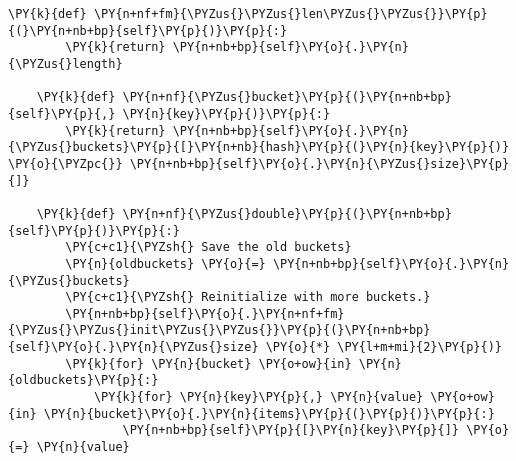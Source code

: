 \begin{Verbatim}[commandchars=\\\{\}]
    \PY{k}{def} \PY{n+nf+fm}{\PYZus{}\PYZus{}len\PYZus{}\PYZus{}}\PY{p}{(}\PY{n+nb+bp}{self}\PY{p}{)}\PY{p}{:}
        \PY{k}{return} \PY{n+nb+bp}{self}\PY{o}{.}\PY{n}{\PYZus{}length}

    \PY{k}{def} \PY{n+nf}{\PYZus{}bucket}\PY{p}{(}\PY{n+nb+bp}{self}\PY{p}{,} \PY{n}{key}\PY{p}{)}\PY{p}{:}
        \PY{k}{return} \PY{n+nb+bp}{self}\PY{o}{.}\PY{n}{\PYZus{}buckets}\PY{p}{[}\PY{n+nb}{hash}\PY{p}{(}\PY{n}{key}\PY{p}{)} \PY{o}{\PYZpc{}} \PY{n+nb+bp}{self}\PY{o}{.}\PY{n}{\PYZus{}size}\PY{p}{]}

    \PY{k}{def} \PY{n+nf}{\PYZus{}double}\PY{p}{(}\PY{n+nb+bp}{self}\PY{p}{)}\PY{p}{:}
        \PY{c+c1}{\PYZsh{} Save the old buckets}
        \PY{n}{oldbuckets} \PY{o}{=} \PY{n+nb+bp}{self}\PY{o}{.}\PY{n}{\PYZus{}buckets}
        \PY{c+c1}{\PYZsh{} Reinitialize with more buckets.}
        \PY{n+nb+bp}{self}\PY{o}{.}\PY{n+nf+fm}{\PYZus{}\PYZus{}init\PYZus{}\PYZus{}}\PY{p}{(}\PY{n+nb+bp}{self}\PY{o}{.}\PY{n}{\PYZus{}size} \PY{o}{*} \PY{l+m+mi}{2}\PY{p}{)}
        \PY{k}{for} \PY{n}{bucket} \PY{o+ow}{in} \PY{n}{oldbuckets}\PY{p}{:}
            \PY{k}{for} \PY{n}{key}\PY{p}{,} \PY{n}{value} \PY{o+ow}{in} \PY{n}{bucket}\PY{o}{.}\PY{n}{items}\PY{p}{(}\PY{p}{)}\PY{p}{:}
                \PY{n+nb+bp}{self}\PY{p}{[}\PY{n}{key}\PY{p}{]} \PY{o}{=} \PY{n}{value}
\end{Verbatim}
